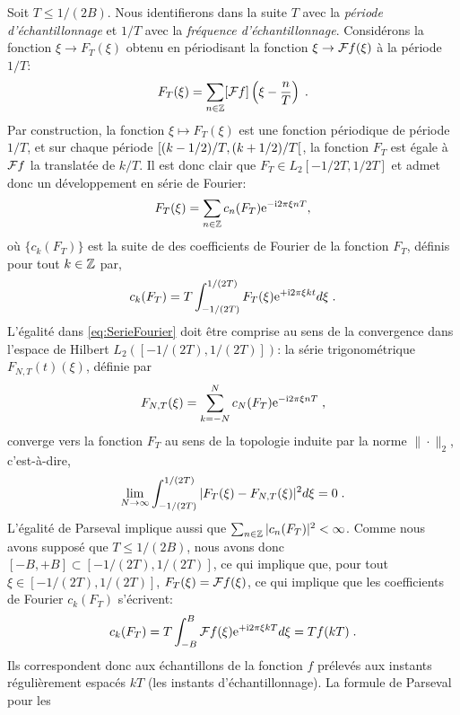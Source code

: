 Soit  $T \leq 1/(2B)$. Nous identifierons dans la suite $T$ avec la \emph{p{\'e}riode d'{\'e}chantillonnage} et $1/T$ avec la \emph{fr{\'e}quence d'{\'e}chantillonnage}.
Consid{\'e}rons la fonction $\xi \to F_T(\xi)$ obtenu en p{\'e}riodisant la fonction $\xi \to \mathcal{F} f(\xi)$ {\`a} la p{\'e}riode $1/T$:
$$
F_T (\xi) = \sum_{n \in \mathbb{Z}} [\mathcal{F} f] \left( \xi - \frac{n}{T} \right) \;.
$$
Par construction, la fonction $\xi \mapsto F_T(\xi)$ est une fonction p{\'e}riodique de p{\'e}riode $1/T$, et sur chaque
p{\'e}riode $\left[(k-1/2)/T,(k+1/2)/T\right[$, la fonction $F_T$ est {\'e}gale {\`a}  $\mathcal{F} f$ la translat{\'e}e de $k/T$.  Il est donc clair que
$F_T \in L_2{[-1/2T,1/2T]}$ et  admet donc un d{\'e}veloppement en s{\'e}rie de
Fourier:
\begin{equation}
\label{eq:SerieFourier}
F_T (\xi) = \sum_{n \in \mathbb{Z}} c_n(F_T) \mathrm{e}^{- \mathrm{i} 2 \pi \xi n T},
\end{equation}
o{\`u} $\{c_k(F_T)\}$ est la suite de des coefficients de Fourier de la fonction $F_T$,
d{\'e}finis pour tout $k\in\mathbb{Z}$ par,
\begin{equation}
\label{eq:CoefficientFourier}
c_k(F_T) = T \int_{-1/(2T)}^{1/(2T)} F_T(\xi) \mathrm{e}^{+ \mathrm{i} 2 \pi \xi k t} d \xi\;.
\end{equation}
L'{\'e}galit{\'e} dans \eqref{eq:SerieFourier} doit {\^e}tre comprise au sens de la convergence dans l'espace de Hilbert
$L_2([-1/(2T),1/(2T)])$: la s{\'e}rie trigonom{\'e}trique $F_{N,T}(t)(\xi)$, d{\'e}finie par
\begin{equation}
F_{N,T}(\xi)= \sum_{k=-N}^N c_N(F_T) \mathrm{e}^{- \mathrm{i} 2 \pi \xi n T} \;,
\end{equation}
converge vers la fonction $F_T$ au sens de la topologie induite par la norme $\|\cdot\|_2$, c'est-{\`a}-dire,
$$
\lim_{N \to \infty} \int_{-1/(2T)}^{1/(2T)} |F_T(\xi) - F_{N,T}(\xi)|^2 d \xi =0 \;.
$$
L'{\'e}galit{\'e} de Parseval implique aussi que $\sum_{n \in \mathbb{Z}} |c_n(F_T)|^2 < \infty$. Comme nous avons suppos{\'e} que $T \leq
1/(2B)$, nous avons donc $[-B,+B] \subset [-1/(2T), 1/(2T)]$,
ce qui implique que, pour tout $\xi \in [-1/(2T),1/(2T)]$, $F_T(\xi) = \mathcal{F} f(\xi)$, ce qui implique que les
coefficients de Fourier $c_k(F_T)$ s'{\'e}crivent:
\begin{equation}
\label{eq:CoefficientFourier}
c_k(F_T) = T \int_{-B}^{B} \mathcal{F} f(\xi) \mathrm{e}^{+ \mathrm{i} 2 \pi \xi k T} d \xi= T f(kT)\;.
\end{equation}
Ils correspondent donc aux {\'e}chantillons de la fonction $f$ pr{\'e}lev{\'e}s aux instants r{\'e}guli{\`e}rement espac{\'e}s $kT$ (les instants d'{\'e}chantillonnage). La formule de Parseval pour les
